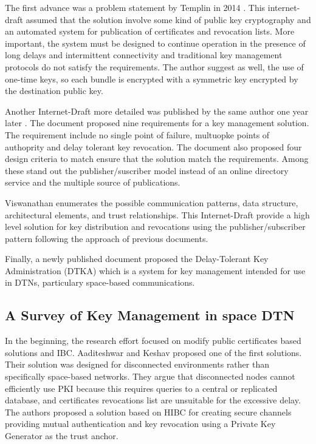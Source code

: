 The first advance was a problem statement by Templin in 2014  \cite{templin-dtnskmps-00}. This internet-draft assumed that the solution involve some kind of public key cryptography and an automated system for publication of certificates and revocation lists. More important, the system must be designed to continue operation in the presence of long delays and intermittent connectivity and traditional key management protocols do not satisfy the requirements. The author suggest as well, the use of one-time keys, so each bundle is encrypted with a symmetric key encrypted by the destination public key. 

Another Internet-Draft more detailed was published by the same author one year later \cite{templin-dtnskmreq-00}. The document proposed nine requirements for a key management solution. The requirement include no single point of failure, multuopke points of authoprity and delay tolerant key revocation. The document also proposed four design criteria to match ensure that the solution match the requirements. Among these stand out the publisher/suscriber model instead of an online directory service and the multiple source of publications. 

Viswanathan \cite{viswanathan-dtn-pkdn-00} enumerates the possible communication patterns, data structure, architectural elements, and trust relationships.  This Internet-Draft provide a high level solution for key distribution and revocations using the publisher/subscriber pattern following the approach of previous documents.

Finally, a newly published document proposed the Delay-Tolerant Key Administration (DTKA) which is a system for key management intended for use in DTNs, particulary space-based communications. 



\subsection{A Survey of Key Management in space DTN}

In the beginning, the research effort focused on modify public certificates based solutions and IBC. Aaditeshwar and Keshav \cite{seth2005practical} proposed one of the first solutions. Their solution was designed for disconnected environments rather than specifically space-based networks. They argue that disconnected nodes cannot efficiently use PKI because this requires queries to a central or replicated database, and certificates revocations list are unsuitable for the excessive delay. The authors proposed a solution based on HIBC for creating secure channels providing mutual authentication and key revocation using a Private Key Generator as the trust anchor. 

